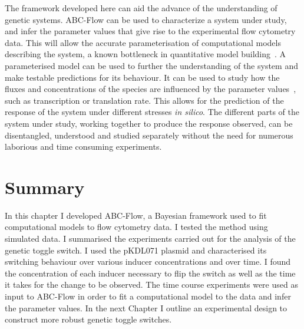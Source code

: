 The framework developed here can aid the advance of the understanding of genetic systems. ABC-Flow can be used to characterize a system under study, and infer the parameter values that give rise to the experimental flow cytometry data. This will allow the accurate parameterisation of computational models describing the system, a known bottleneck in quantitative model building~\autocite{LeNovere:2015dp}. A parameterised model can be used to further the understanding of the system and make testable predictions for its behaviour. It can be used to study how the fluxes and concentrations of the species are influenced by the parameter values~\autocite{Li:2010kt}, such as transcription or translation rate. This allows for the prediction of the response of the system under different stresses \textit{in silico}. The different parts of the system under study, working together to produce the response observed, can be disentangled, understood and studied separately without the need for numerous laborious and time consuming experiments. 


\section{Summary}


In this chapter I developed ABC-Flow, a Bayesian framework used to fit computational models to flow cytometry data. I tested the method using simulated data. I summarised the experiments carried out for the analysis of the genetic toggle switch. I used the pKDL071 plasmid and characterised its switching behaviour over various inducer concentrations and over time. I found the concentration of each inducer necessary to flip the switch as well as the time it takes for the change to be observed. The time course experiments were used as input to ABC-Flow in order to fit a computational model to the data and infer the parameter values. In the next Chapter I outline an experimental design to construct more robust genetic toggle switches.







 
 